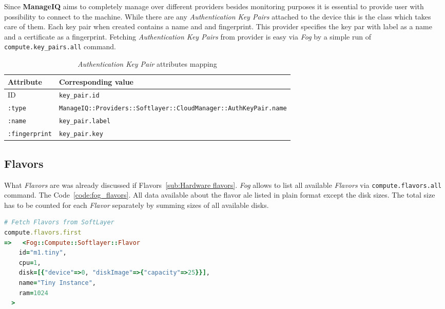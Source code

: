 Since \textbf{ManageIQ} aims to completely manage over different providers besides monitoring purposes it is essential to provide user with possibility to connect to the machine. While there are any \emph{Authentication Key Pairs} attached to the device this is the class which takes care of them. Each key pair when created contains a name and and fingerprint. This provider specifies the key par with label as a name and a certificate as a fingerprint. Fetching \emph{Authentication Key Pairs} from provider is easy via \emph{Fog} by a simple run of \texttt{compute.key\_pairs.all} command.

\begin{table}[ht]
	\centering
	\caption{\emph{Authentication Key Pair} attributes mapping}\label{tab:Authentication Key Pair attributes mapping}
	\begin{tabular}{ll}
		\toprule
		Attribute             & Corresponding value                                                           \\
		\midrule
		ID                    & \texttt{key\_pair.id}                                                         \\
		\texttt{:type}        & \small\texttt{ManageIQ::Providers::Softlayer::CloudManager::AuthKeyPair.name} \\
		\texttt{:name}        & \texttt{key\_pair.label}                                                      \\
		\texttt{:fingerprint} & \texttt{key\_pair.key}                                                        \\
		\bottomrule
	\end{tabular}
\end{table}

\subsection{Flavors}
\label{sub:Flavors}

What \emph{Flavors} are was already discussed if Flavors~\ref{sub:Hardware flavors}. \emph{Fog} allows to list all available \emph{Flavors} via \texttt{compute.flavors.all} command. The Code~\ref{code:fog_flavors}. All data available about the flavor ale listed in plain format except the disk sizes. The total size has to be counted for each \emph{Flavor} separately by summing sizes of all available disks.

\begin{lstlisting}[language=Ruby,caption={Sample of \emph{Flavors} data},label=code:fog_flavors,float=htpb]
# Fetch Flavors from SoftLayer
compute.flavors.first
=>   <Fog::Compute::Softlayer::Flavor
    id="m1.tiny",
    cpu=1,
    disk=[{"device"=>0, "diskImage"=>{"capacity"=>25}}],
    name="Tiny Instance",
    ram=1024
  >
\end{lstlisting}

